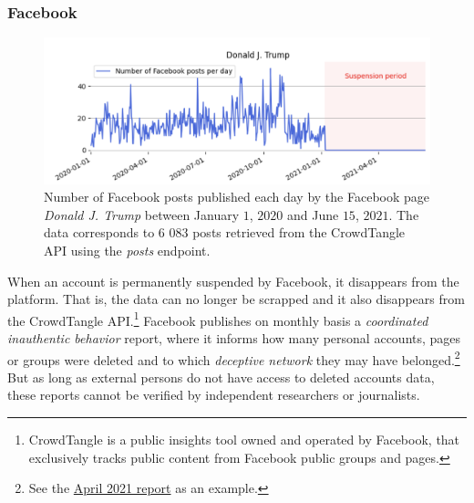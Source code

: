 \documentclass{article}
\begin{document}
\subsubsection{Facebook}

\begin{figure}
	\centering
			\includegraphics[scale=0.3]{./img/fb/fig1_fb.png}
	\caption{Number of Facebook posts published each day by the Facebook page {\it Donald J. Trump} between January $1$, $2020$ and June $15$, $2021$. The data corresponds to $6$ $083$ posts retrieved from the CrowdTangle API using the {\it posts} endpoint.}
	\label{fig1_fb}
\end{figure}

When an account is permanently suspended by Facebook, it disappears from the platform. That is,  the data can no longer be scrapped and it also disappears from the CrowdTangle API.\footnote{CrowdTangle is a public insights tool owned and operated by Facebook, that exclusively tracks public content from Facebook public groups and pages.} Facebook publishes on monthly basis a {\it coordinated inauthentic behavior} report, where it informs how many personal accounts, pages or groups were deleted and to which {\it deceptive network} they may have belonged.\footnote{See the \href{https://about.fb.com/news/2021/05/april-2021-coordinated-inauthentic-behavior-report/}{April 2021 report} as an example.} But as long as external persons do not have access to deleted accounts data, these reports cannot be verified by independent researchers or journalists.
\end{document}
